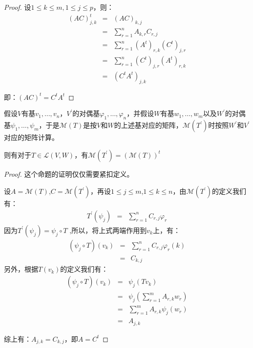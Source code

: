 \documentclass[10pt,a4paper,UTF8]{article}
\begin{document}
\begin{proof}
设\(1\leq k \leq m, 1\leq j\leq p\)，则：
\begin{eqnarray}
\label{eq:1}
(AC)^{t}_{j,k}&=& (AC)_{k,j} \\
&=&\sum_{r=1}^{n}A_{k,r}C_{r,j} \\
&=&\sum_{r=1}^{n}(A^{t})_{r,k}(C^{t})_{j,r} \\
&=&\sum_{r=1}^{n} (C^{t})_{j,r}(A^{t})_{r,k} \\
&=& (C^{t}A^{t})_{j,k}
\end{eqnarray}

即：\((AC)^{t} = C^{t}A^{t}\)
\end{proof}

\begin{theorem}
假设\(V\)有基\(v_{1},\ldots ,v_{n}\)，\(V^{'}\)的对偶基\(\varphi_{1},\ldots ,\varphi_{n}\)，并假设\(W\)有基\(w_{1},\ldots ,w_{m}\)以及\(W^{'}\)的对偶基\(\psi_{1},\ldots ,\psi_{m}\)，于是\(\mathcal{M}(T)\)是按\(V\)和\(W\)的上述基对应的矩阵，\(\mathcal{M}(T^{'})\)时按照\(W^{'}\)和\(V^{'}\)对应的矩阵计算。

则有对于\(T\in \mathcal{L}(V,W)\)，有\(\mathcal{M}(T^{'}) = (\mathcal{M}(T))^{t}\)
\end{theorem}

\begin{proof}
这个命题的证明仅仅需要紧扣定义。

设\(A = \mathcal{M}(T)\),\(C = \mathcal{M}(T^{'})\)，再设\(1\leq j \leq m\),\(1\leq k \leq n\)，由\(\mathcal{M}(T^{'})\)的定义我们有：
\begin{eqnarray}
\label{eq:2}
T^{'}(\psi_{j})&=& \sum_{r=1}^{n}C_{r,j}\varphi_{r} 
\end{eqnarray}
因为\(T^{'}(\psi_{j}) = \psi_{j} \circ T\) ,所以，将上式两端作用到\(v_{k}\)上，有：
\begin{eqnarray}
\label{eq:3}
(\psi_{j}\circ T)(v_{k})&=& \sum_{r=1}^{n}C_{r,j}\varphi_{r}(k) \\
&=&C_{k,j}
\end{eqnarray}
另外，根据\(T(v_{k})\)的定义我们有：
\begin{eqnarray}
\label{eq:4}
(\psi_{j}\circ T)(v_{k})&=& \psi_{j}(Tv_{k}) \\
&=& \psi_{j}(\sum_{r=1}^{m} A_{r,k}w_{r}) \\
&=&\sum_{r=1}^{m}A_{r,k}\psi_{j}(w_{r}) \\
&=&A_{j,k}
\end{eqnarray}

综上有：\(A_{j,k} = C_{k,j}\)，即\(A = C^{t}\)
\end{proof}
\end{document}
